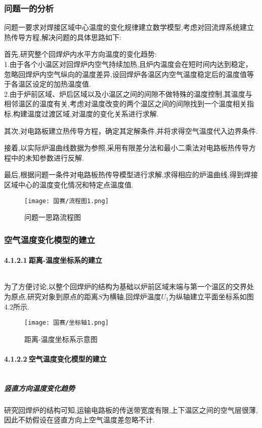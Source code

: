 \documentclass[12pt]{ctexart}
\numberwithin{figure}{section}
\numberwithin{table}{section}
\begin{document}
\subsubsection{问题一的分析}
问题一要求对焊接区域中心温度的变化规律建立数学模型,考虑对回流焊系统建立热传导方程,解决问题的具体思路如下:

首先,研究整个回焊炉内水平方向温度的变化趋势:\\
1.由于各个小温区对回焊炉内空气持续加热,且炉内温度会在短时间内达到稳定，忽略回焊炉内空气纵向的温度差异,设回焊炉各温区内空气温度稳定后的温度值等于各温区设定的加热温度值.\\
2.由于炉前区域、炉后区域以及小温区之间的间隙不做特殊的温度控制,其温度与相邻温区的温度有关,考虑对温度改变的两个温区之间的间隙找到一个温度相关指标,构建温度过渡区域,对温度的变化关系进行求解.

其次,对电路板建立热传导方程，确定其定解条件,并将求得空气温度代入边界条件.

接着,以实际炉温曲线数据为参照,采用有限差分法和最小二乘法对电路板热传导方程中的未知参数进行反解.

最后,根据问题一条件对电路板热传导模型进行求解,求得相应的炉温曲线,得到焊接区域中心的温度变化情况和特定点温度值.
\begin{figure}[!htp]
    \centering
    \setlength{\belowcaptionskip}{0pt}
    \texttt{[image: 国赛/流程图1.png]}
    \caption{问题一思路流程图}
    \label{tab:图1}
\end{figure}
\subsubsection{空气温度变化模型的建立}
\paragraph{4.1.2.1$\ $距离-温度坐标系的建立}$\ $

为了方便讨论,以整个回焊炉的结构为基础以炉前区域末端与第一个温区的交界处为原点,研究对象到原点的距离$S$为横轴,回焊炉温度$U_1$为纵轴建立平面坐标系如图4.2所示.
\begin{figure}[!htp]
    \centering
    \setlength{\belowcaptionskip}{0pt}
    \texttt{[image: 国赛/坐标轴1.png]}    \caption{距离-温度坐标系示意图}
    \label{tab:图1}
\end{figure}
\paragraph{4.1.2.2$\ $空气温度变化模型的建立}$\ $
\subparagraph{竖直方向温度变化趋势}
研究回焊炉的结构可知,运输电路板的传送带宽度有限,上下温区之间的空气层很薄,因此不妨假设在竖直方向上空气温度差忽略不计.
\end{document}
